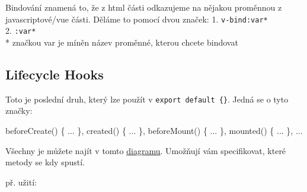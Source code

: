 \documentclass[
]{article}
\newenvironment{Shaded}{}{}
\newcommand{\AttributeTok}[1]{\textcolor[rgb]{0.49,0.56,0.16}{#1}}
\newcommand{\CommentTok}[1]{\textcolor[rgb]{0.38,0.63,0.69}{\textit{#1}}}
\newcommand{\KeywordTok}[1]{\textcolor[rgb]{0.00,0.44,0.13}{\textbf{#1}}}
\newcommand{\NormalTok}[1]{#1}
\newcommand{\OperatorTok}[1]{\textcolor[rgb]{0.40,0.40,0.40}{#1}}
\newcommand{\StringTok}[1]{\textcolor[rgb]{0.25,0.44,0.63}{#1}}
\newcommand{\VariableTok}[1]{\textcolor[rgb]{0.10,0.09,0.49}{#1}}
\begin{document}
Bindování znamená to, že z html části odkazujeme na nějakou proměnnou z
javascriptové/vue části. Děláme to pomocí dvou značek: 1.
\texttt{v-bind:var*}\\
2. \texttt{:var*}\\
* značkou var je míněn název proměnné, kterou chcete bindovat

\hypertarget{lifecycle-hooks}{%
\subsection{Lifecycle Hooks}\label{lifecycle-hooks}}

Toto je poslední druh, který lze použít v
\texttt{export\ default\ \{\}}. Jedná se o tyto značky:

\begin{Shaded}
\begin{Highlighting}[]
\AttributeTok{beforeCreate}\NormalTok{() }\OperatorTok{\{}
\NormalTok{    ...}
\OperatorTok{\},}
\AttributeTok{created}\NormalTok{() }\OperatorTok{\{}
\NormalTok{    ...}
\OperatorTok{\},}
\AttributeTok{beforeMount}\NormalTok{() }\OperatorTok{\{}
\NormalTok{    ...}
\OperatorTok{\},}
\AttributeTok{mounted}\NormalTok{() }\OperatorTok{\{}
\NormalTok{    ...}
\OperatorTok{\},}
\NormalTok{...}
\end{Highlighting}
\end{Shaded}

Všechny je můžete najít v tomto
\href{https://vuejs.org/v2/guide/instance.html\#Lifecycle-Diagram}{diagramu}.
Umožňují vám specifikovat, které metody se kdy spustí.

př. užití:

\begin{Shaded}
\end{Shaded}
\end{document}
